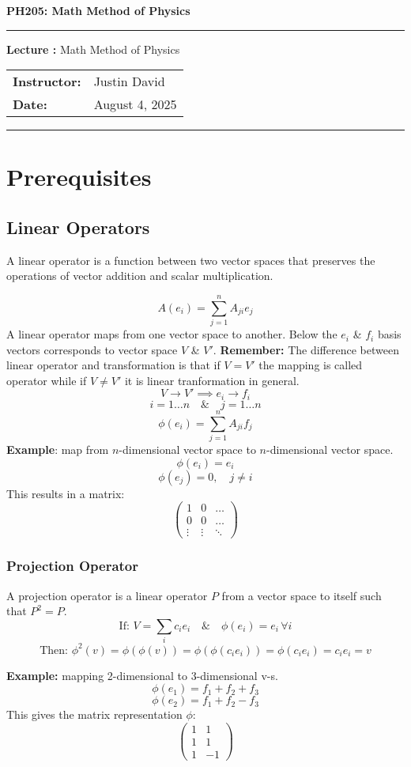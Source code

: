 \documentclass[12pt, a4paper]{report}
\newcommand{\courseTitle}{Default Course Title}
\newcommand{\lectureNumber}{XX}
\newcommand{\lectureTopic}{Default Lecture Topic}
\newcommand{\lectureDate}{\today}
\newcommand{\instructorName}{Professor Name}
\renewcommand{\maketitle}{
    \begin{center}
        \vspace*{\fill}
        {\Huge\bfseries \courseTitle}
        \vspace{0.5cm}
        
        \hrule
        \vspace{0.5cm}
        
        {\Large \textbf{Lecture \lectureNumber:} \lectureTopic}
        \vspace{0.5cm}
        
        \begin{tabular}{ll}
            \bfseries Instructor: & \instructorName \\
            \bfseries Date: & \lectureDate \\
        \end{tabular}
        
        \vspace{0.5cm}
        \hrule
        \vspace*{\fill}
    \end{center}
}
\renewcommand{\courseTitle}{PH205: Math Method of Physics}
\renewcommand{\lectureNumber}{}
\renewcommand{\lectureTopic}{Math Method of Physics}
\renewcommand{\lectureDate}{August 4, 2025}
\renewcommand{\instructorName}{Justin David}
\begin{document}
\maketitle %

\tableofcontents %
\newpage

\chapter{Prerequisites}

\section{Linear Operators}
A linear operator is a function between two vector spaces that preserves the operations of vector addition and scalar multiplication.

$$
A(e_i) = \sum_{j=1}^n A_{ji} e_j
$$
A linear operator maps from one vector space to another. Below the $e_i$ \& $f_i$ basis vectors corresponds to vector space $V$ \& $V'$. 
\textbf{Remember: }The difference between linear operator and transformation is that if $V = V'$ the mapping is called operator while if $V \neq V'$ it is linear tranformation in general.
$$
V \to V' \implies e_i \to f_i
$$
$$
i = 1 \dots n \quad \& \quad
j = 1 \dots n
$$
$$
\phi(e_i) = \sum_{j=1}^n A_{ji} f_j
$$
\textbf{Example}: map from $n$-dimensional vector space to $n$-dimensional vector space.
$$
\phi(e_i) = e_i
$$
$$
\phi(e_j) = 0, \quad j \ne i
$$
This results in a matrix:
$$
\begin{pmatrix}
1 & 0 & \dots \\
0 & 0 & \dots \\
\vdots & \vdots & \ddots
\end{pmatrix}
$$

\subsection{Projection Operator}
A projection operator is a linear operator $P$ from a vector space to itself such that $P^2 = P$.
$$
\text{If: }V = \sum_{i} c_i e_i \quad \& \quad \phi(e_i) = e_i \, \forall i
$$
$$
\text{Then: }\phi^2(v) = \phi(\phi(v)) = \phi(\phi(c_i e_i)) = \phi(c_i e_i) = c_i e_i = v
$$

\textbf{Example:} mapping 2-dimensional to 3-dimensional v-s.
$$
\phi(e_1) = f_1+f_2+f_3
$$
$$
\phi(e_2) = f_1+f_2-f_3
$$
This gives the matrix representation $\phi$:
$$
\begin{pmatrix}
1 & 1 \\
1 & 1 \\
1 & -1
\end{pmatrix}
$$
\end{document}
